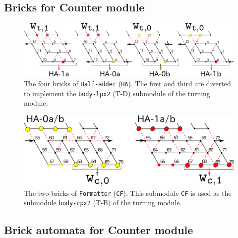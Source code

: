 \documentclass[runningheads]{llncs}
\begin{document}
	\subsection{Bricks for Counter module}
	\label{ap_subsect:Counter_module_bricks}

\begin{figure}[htb]
\centering
\includegraphics[width=\linewidth]{Figs/counter_zig.png}
\caption{The four bricks of \texttt{Half-adder} (\texttt{HA}).
The first and third are diverted to implement the \texttt{body-lpx2} (T-D) submodule of the turning module. 
}
\label{fig:half-adder}
\end{figure}

\begin{figure}[htb]
\centering
\includegraphics[width=0.66\linewidth]{Figs/counter_zag.png}
\caption{The two bricks of \texttt{Formatter} (\texttt{CF}).
This submodule \texttt{CF} is used as the submodule \texttt{body-rpx2} (T-B) of the turning module. 
}
\label{fig:formatter}
\end{figure}

\clearpage

	\subsection{Brick automata for Counter module}
	\label{ap_subsect:Counter_module_BA}
\end{document}
